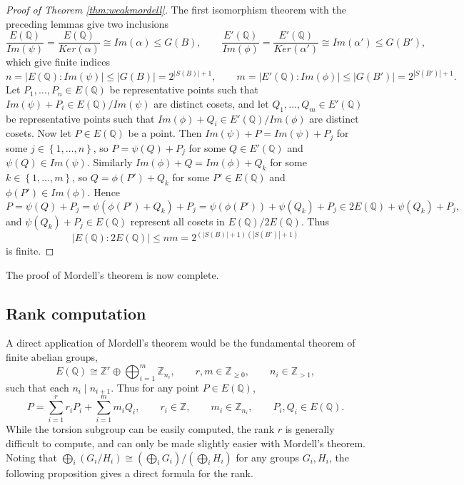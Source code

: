 \documentclass{article}
\newcommand{\Z}{\mathbb{Z}}
\newcommand{\Q}{\mathbb{Q}}
\newcommand{\rb}[1]{\left( #1 \right)}
\newcommand{\cb}[1]{\left\{ #1 \right\}}
\newcommand{\abs}[1]{\left\lvert #1 \right\rvert}
\theoremstyle{definition}
\begin{document}
\begin{proof}[Proof of Theorem \ref{thm:weakmordell}]
The first isomorphism theorem with the preceding lemmas give two inclusions
$$ \dfrac{E\rb{\Q}}{Im\rb{\psi}} = \dfrac{E\rb{\Q}}{Ker\rb{\alpha}} \cong Im\rb{\alpha} \le G\rb{B}, \qquad \dfrac{E'\rb{\Q}}{Im\rb{\phi}} = \dfrac{E'\rb{\Q}}{Ker\rb{\alpha'}} \cong Im\rb{\alpha'} \le G\rb{B'}, $$
which give finite indices
$$ n = \abs{E\rb{\Q} : Im\rb{\psi}} \le \abs{G\rb{B}} = 2^{\abs{S\rb{B}} + 1}, \qquad m = \abs{E'\rb{\Q} : Im\rb{\phi}} \le \abs{G\rb{B'}} = 2^{\abs{S\rb{B'}} + 1}. $$
Let $ P_1, \dots, P_n \in E\rb{\Q} $ be representative points such that $ Im\rb{\psi} + P_i \in E\rb{\Q} / Im\rb{\psi} $ are distinct cosets, and let $ Q_1, \dots, Q_m \in E'\rb{\Q} $ be representative points such that $ Im\rb{\phi} + Q_i \in E'\rb{\Q} / Im\rb{\phi} $ are distinct cosets. Now let $ P \in E\rb{\Q} $ be a point. Then $ Im\rb{\psi} + P = Im\rb{\psi} + P_j $ for some $ j \in \cb{1, \dots, n} $, so $ P = \psi\rb{Q} + P_j $ for some $ Q \in E'\rb{\Q} $ and $ \psi\rb{Q} \in Im\rb{\psi} $. Similarly $ Im\rb{\phi} + Q = Im\rb{\phi} + Q_k $ for some $ k \in \cb{1, \dots, m} $, so $ Q = \phi\rb{P'} + Q_k $ for some $ P' \in E\rb{\Q} $ and $ \phi\rb{P'} \in Im\rb{\phi} $. Hence
$$ P = \psi\rb{Q} + P_j = \psi\rb{\phi\rb{P'} + Q_k} + P_j = \psi\rb{\phi\rb{P'}} + \psi\rb{Q_k} + P_j \in 2E\rb{\Q} + \psi\rb{Q_k} + P_j, $$
and $ \psi\rb{Q_k} + P_j \in E\rb{\Q} $ represent all cosets in $ E\rb{\Q} / 2E\rb{\Q} $. Thus
$$ \abs{E\rb{\Q} : 2E\rb{\Q}} \le nm = 2^{\rb{\abs{S\rb{B}} + 1}\rb{\abs{S\rb{B'}} + 1}} $$
is finite.
\end{proof}

The proof of Mordell's theorem is now complete.

\pagebreak

\subsection{Rank computation}

A direct application of Mordell's theorem would be the fundamental theorem of finite abelian groups,
$$ E\rb{\Q} \cong \Z^r \oplus \bigoplus_{i = 1}^m \Z_{n_i}, \qquad r, m \in \Z_{\ge 0}, \qquad n_i \in \Z_{> 1}, $$
such that each $ n_i \mid n_{i + 1} $. Thus for any point $ P \in E\rb{\Q} $,
$$ P = \sum_{i = 1}^r r_iP_i + \sum_{i = 1}^m m_iQ_i, \qquad r_i \in \Z, \qquad m_i \in \Z_{n_i}, \qquad P_i, Q_i \in E\rb{\Q}. $$
While the torsion subgroup can be easily computed, the rank $ r $ is generally difficult to compute, and can only be made slightly easier with Mordell's theorem. Noting that $ \bigoplus_i \rb{G_i / H_i} \cong \rb{\bigoplus_i G_i} / \rb{\bigoplus_i H_i} $ for any groups $ G_i, H_i $, the following proposition gives a direct formula for the rank.
\end{document}
